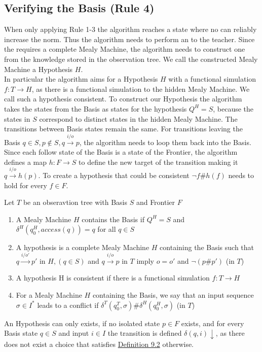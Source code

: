 \subsection{Verifying the Basis (Rule 4)}
When only applying Rule 1-3 the algorithm reaches a state where no \oquery\space can reliably increase the norm. Thus the algorithm needs to perform an \equery\space to the teacher. Since the \equery\space requires a complete Mealy Machine, the algorithm needs to construct one from the knowledge stored in the observation tree. We call the constructed Mealy Machine a Hypothesis $H$.\\
In particular the algorithm aims for a Hypothesis $H$ with a functional simulation $f:T\rightarrow H$, as there is a functional simulation to the hidden Mealy Machine. We call such a hypothesis consistent. To construct our Hypothesis the algorithm takes the states from the Basis as states for the hypothesis $Q^H=S $, because the states in $S$ correspond to distinct states in the hidden Mealy Machine. The transitions between Basis states remain the same. For transitions leaving the Basis $q\in S, p\notin S, q\xrightarrow{i/o}p$, the algorithm needs to loop them back into the Basis. Since each follow state of the Basis is a state of the Frontier, the algorithm defines a map $h:F\rightarrow S$ to define the new target of the transition making it $q\xrightarrow{i/o}h(p)$. To create a hypothesis that could be consistent $\neg f\#h(f)$ needs to hold for every $f\in F$. 
\begin{definition} \label{def:hypo}
	Let $T$ be an obseravtion tree with Basis $S$ and Frontier $F$
	\begin{enumerate}
		\item A Mealy Machine $H$ contains the Basis if $Q^H=S$ and $\delta^H(q_0^H,access(q))=q$ for all $q\in S$
		\item\label{def:hypo:two} A hypothesis is a complete Mealy Machine $H$ containing the Basis such that $q\xrightarrow{i/o'}p'$ in $H, (q\in S)$ and $q\xrightarrow{i/o}p$ in $T$ imply $o=o'$ and $\neg (p\#p')$ (in $T$)
		\item A hypothesis H is consistent if there is a functional simulation $f:T\rightarrow H$
		\item For a Mealy Machine $H$ containing the Basis, we say that an input sequence $\sigma\in I^*$ leads to a conflict if $\delta^T(q_0^T,\sigma)\#\delta^H(q_0^H,\sigma)$ (in $T$)
	\end{enumerate}
\end{definition}
An Hypothesis can only exists, if no isolated state $p\in F$ exists, and for every Basis state $q\in S$ and input $i\in I$ the transition is defined $\delta(q,i)\downarrow$, as there does not exist a choice that satisfies \hyperref[def:hypo:two]{Definition 9.2} otherwise. 


